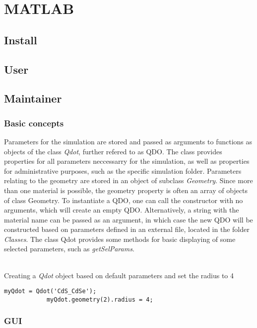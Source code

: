 \chapter{MATLAB}
\section{Install}
\section{User}
\section{Maintainer}
\subsection{Basic concepts}
	Parameters for the simulation are stored and passed as arguments to functions as objects of the class \textit{Qdot}, further refered to as QDO. 
	The class provides properties for all parameters neccessarry for the simulation, as well as properties for administrative purposes, such as the 
	specific simulation folder. Parameters relating to the geometry are stored in an object of subclass \textit{Geometry}. Since more than one material 
	is possible, the geometry property is often an array of objects of class Geometry. 
	To instantiate a QDO, one can call the constructor with no arguments, which will create an empty QDO. Alternatively, a string with the material 
	name can be passed as an argument, in which case the new QDO will be constructed based on parameters defined in an external file, located 
	in the folder \textit{Classes}.
	The class Qdot provides some methods for basic displaying of some selected parameters, such as \textit{getSelParams}.\\\\
	\begin{EXAMPLE}
		Creating a \textit{Qdot} object based on default parameters and set the radius to 4
		\begin{lstlisting}[frame=none]
			myQdot = Qdot('CdS_CdSe');
			myQdot.geometry(2).radius = 4;\end{lstlisting}
	\end{EXAMPLE}
\subsection{GUI}
